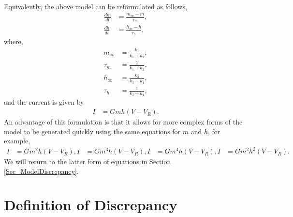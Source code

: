 \documentclass[11pt,a4paper,oneside]{article}
\begin{document}
Equivalently, the above model can be reformulated as follows,
\begin{align}
\frac{dm}{dt} & = \frac{m_{\infty} - m}{\tau_m},\\
\frac{dh}{dt} & = \frac{h_{\infty} - h}{\tau_h},
\end{align}
where, 
\begin{align}
m_{\infty} & = \frac{k_1}{k_1+k_2},\\
\tau_{m} & = \frac{1}{k_1+k_2},\\
h_{\infty} & = \frac{k_3}{k_3+k_4},\\
\tau_{h} & = \frac{1}{k_3+k_4},
\end{align}
and the current is given by
\begin{align}
I & = G m h(V-V_R).
\end{align}
An advantage of this formulation is that it allows for more complex forms of the model to be generated quickly using the same equations for $m$ and $h$, for example,
\begin{align}
I & = G m^2 h(V-V_R),
I & = G m^3 h(V-V_R),
I & = G m^4 h(V-V_R),
I & = G m^2 h^2(V-V_R). \label{Eq_m2h2}
\end{align}
We will return to the latter form of equations in Section \ref{Sec_ModelDiscrepancy}.


\section{Definition of Discrepancy} \label{Sec_ModelsOfDiscrepancy}
\end{document}
